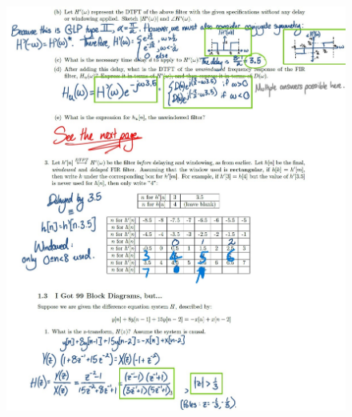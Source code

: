 \documentclass{article}
\begin{document}
\begin{figure}[h!]
\begin{center}
    \includegraphics[width= \textwidth]{figures/Solutions pg 3.jpg}
    \label{fig:old_solutions_3}
\end{center}
\end{figure}

\newpage
\end{document}
